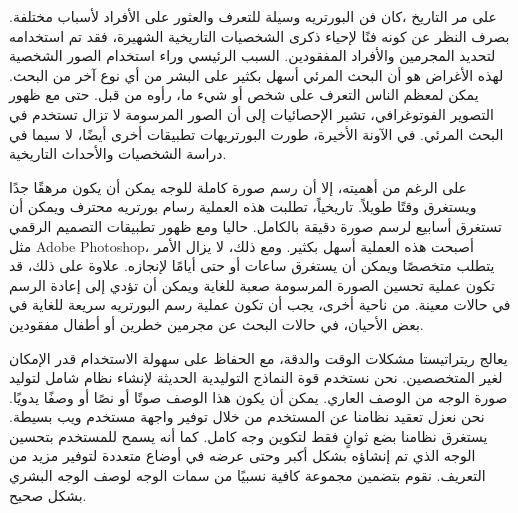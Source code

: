 على مر التاريخ ،كان فن البورتريه وسيلة للتعرف والعثور على الأفراد لأسباب مختلفة. بصرف النظر عن كونه فنًا لإحياء ذكرى الشخصيات التاريخية الشهيرة، فقد تم استخدامه لتحديد المجرمين والأفراد المفقودين. السبب الرئيسي وراء استخدام الصور الشخصية لهذه الأغراض هو أن البحث المرئي أسهل بكثير على البشر من أي نوع آخر من البحث. يمكن لمعظم الناس التعرف على شخص أو شيء ما، رأوه من قبل. حتى مع ظهور التصوير الفوتوغرافي، تشير الإحصائيات إلى أن الصور المرسومة لا تزال تستخدم في البحث المرئي. في الآونة الأخيرة، طورت البورتريهات تطبيقات أخرى أيضًا، لا سيما في دراسة الشخصيات والأحداث التاريخية.

على الرغم من أهميته، إلا أن رسم صورة كاملة للوجه يمكن أن يكون مرهقًا جدًا ويستغرق وقتًا طويلاً. تاريخياً، تطلبت هذه العملية رسام بورتريه محترف ويمكن أن تستغرق أسابيع لرسم صورة دقيقة بالكامل. حاليا ومع ظهور تطبيقات التصميم الرقمي مثل Adobe Photoshop، أصبحت هذه العملية أسهل بكثير. ومع ذلك، لا يزال الأمر يتطلب متخصصًا ويمكن أن يستغرق ساعات أو حتى أيامًا لإنجازه. علاوة على ذلك، قد تكون عملية تحسين الصورة المرسومة صعبة للغاية ويمكن أن تؤدي إلى إعادة الرسم في حالات معينة. من ناحية أخرى، يجب أن تكون عملية رسم البورتريه سريعة للغاية في بعض الأحيان، في حالات البحث عن مجرمين خطرين أو أطفال مفقودين.

يعالج ريتراتيستا مشكلات الوقت والدقة، مع الحفاظ على سهولة الاستخدام قدر الإمكان لغير المتخصصين. نحن نستخدم قوة النماذج التوليدية الحديثة لإنشاء نظام شامل لتوليد صورة الوجه من الوصف العاري. يمكن أن يكون هذا الوصف صوتًا أو نصًا أو وصفًا يدويًا. نحن نعزل تعقيد نظامنا عن المستخدم من خلال توفير واجهة مستخدم ويب بسيطة. يستغرق نظامنا بضع ثوانٍ فقط لتكوين وجه كامل. كما أنه يسمح للمستخدم بتحسين الوجه الذي تم إنشاؤه بشكل أكبر وحتى عرضه في أوضاع متعددة لتوفير مزيد من التعريف. نقوم بتضمين مجموعة كافية نسبيًا من سمات الوجه لوصف الوجه البشري بشكل صحيح.
